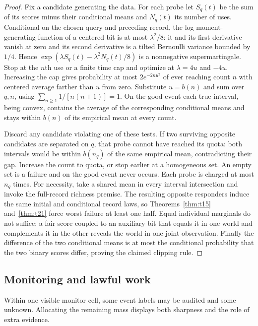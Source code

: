 \begin{proof}

Fix a candidate generating the data. For each probe let \(S_q(t)\) be the sum of its scores minus their conditional means and \(N_q(t)\) its number of uses. Conditional on the chosen query and preceding record, the log moment-generating function of a centered bit is at most \(\lambda^2/8\): it and its first derivative vanish at zero and its second derivative is a tilted Bernoulli variance bounded by \(1/4\). Hence \(\exp(\lambda S_q(t)-\lambda^2 N_q(t)/8)\) is a nonnegative supermartingale. Stop at the \(n\)th use or a finite time cap and optimize at \(\lambda=4u\) and \(-4u\). Increasing the cap gives probability at most \(2e^{-2nu^2}\) of ever reaching count \(n\) with centered average farther than \(u\) from zero. Substitute \(u=b(n)\) and sum over \(q,n\), using \(\sum_{n\ge1}1/[n(n+1)]=1\). On the good event each true interval, being convex, contains the average of the corresponding conditional means and stays within \(b(n)\) of its empirical mean at every count.

Discard any candidate violating one of these tests. If two surviving opposite candidates are separated on \(q\), that probe cannot have reached its quota: both intervals would be within \(b(n_q)\) of the same empirical mean, contradicting their gap. Increase the count to quota, or stop earlier at a homogeneous set. An empty set is a failure and on the good event never occurs. Each probe is charged at most \(n_q\) times. For necessity, take a shared mean in every interval intersection and invoke the full-record richness premise. The resulting opposite responders induce the same initial and conditional record laws, so Theorems~\ref{thm:t15} and~\ref{thm:t21} force worst failure at least one half. Equal individual marginals do not suffice: a fair score coupled to an auxiliary bit that equals it in one world and complements it in the other reveals the world in one joint observation. Finally the difference of the two conditional means is at most the conditional probability that the two binary scores differ, proving the claimed clipping rule.

\end{proof}

\subsection{Monitoring and lawful work}

Within one visible monitor cell, some event labels may be audited and some unknown. Allocating the remaining mass displays both sharpness and the role of extra evidence.

